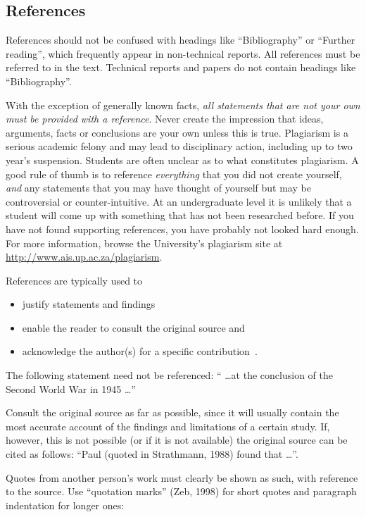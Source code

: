 \documentclass[a5paper, 10pt]{article}
\begin{document}
\subsection{References}
\label{sec:references}
References should not be confused with headings like ``Bibliography''
or ``Further reading'', which frequently appear in non-technical
reports.  All references must be referred to in the text. Technical
reports and papers do not contain headings like ``Bibliography''.

With the exception of generally known facts, \emph{all statements that are
not your own must be provided with a reference}.  Never create the
impression that ideas, arguments, facts or conclusions are your own
unless this is true.  Plagiarism is a serious academic felony and may lead to disciplinary action, including up to two year's suspension.
Students are often unclear as to what constitutes plagiarism.  A good
rule of thumb is to reference \emph{everything} that you did not
create yourself, \emph{and} any statements that you may have thought
of yourself but may be controversial or counter-intuitive.  At an
undergraduate level it is unlikely that a student will come up with
something that has not been researched before.  If you have not found
supporting references, you have probably not looked hard enough.  For
more information, browse the University's plagiarism site at
\url{http://www.ais.up.ac.za/plagiarism}.

References are typically used to 
\begin{itemize}
\item justify statements and findings
\item enable the reader to consult the original source and
\item acknowledge the author(s) for a specific
  contribution~\citep{burger}.
\end{itemize}

The following statement need not be referenced: `` \dots at
the conclusion of the Second World War in 1945 \dots''

Consult the original source as far as possible, since it will usually
contain the most accurate account of the findings and limitations of a
certain study.  If, however, this is not possible (or if it is not
available) the original source can be cited as follows: ``Paul (quoted
in Strathmann, 1988) found that \dots''.  

Quotes from another person's work must clearly be shown as such, with
reference to the source.  Use ``quotation marks'' (Zeb, 1998) for
short quotes and paragraph indentation for longer ones:
\end{document}
